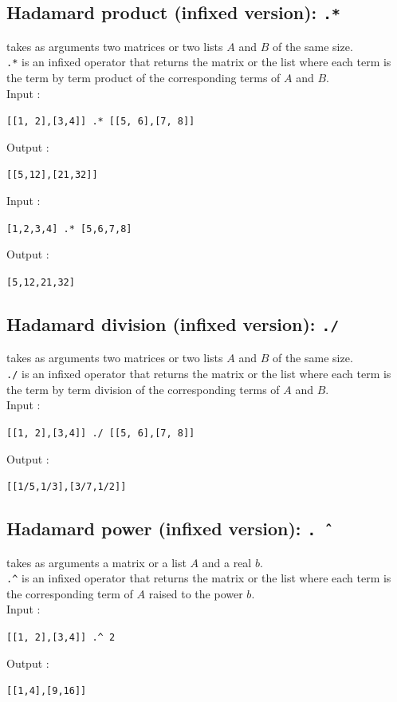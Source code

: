 \documentclass[a4paper,11pt]{book}
\begin{document}
\subsection{Hadamard product (infixed version): {\tt .*}}
 takes as arguments two matrices or two lists $A$ and  $B$ 
of the same size.\\
{\tt  .*} is an infixed operator that returns the matrix or the list 
where each term is the term by term product of the corresponding
terms of $A$ and  $B$.\\ 
Input :
\begin{center}{\tt [[1, 2],[3,4]] .* [[5, 6],[7, 8]]}\end{center}
Output :
\begin{center}{\tt [[5,12],[21,32]]}\end{center}
Input :
\begin{center}{\tt [1,2,3,4] .* [5,6,7,8]}\end{center}
Output :
\begin{center}{\tt [5,12,21,32]}\end{center}

\subsection{Hadamard division (infixed version): {\tt ./}}
 takes as arguments two matrices or two lists $A$ and 
$B$ of the same size.\\
{\tt  ./} is an infixed operator that returns the matrix or the list 
where each term is the term by term division of the corresponding
terms of $A$ and  $B$.\\ 
Input :
\begin{center}{\tt [[1, 2],[3,4]] ./ [[5, 6],[7, 8]]}\end{center}
Output :
\begin{center}{\tt [[1/5,1/3],[3/7,1/2]]}\end{center}

\subsection{Hadamard power (infixed version): {\tt .\^\ }}
 takes as arguments a matrix or a list
$A$ and a real $b$.\\
{\tt  .\verb|^|}  is an infixed operator that returns the matrix 
or the list where each term is the corresponding
term of $A$ raised to the power $b$.\\ 
Input :
\begin{center}{\tt [[1, 2],[3,4]] .\verb|^| 2}\end{center}
Output :
\begin{center}{\tt [[1,4],[9,16]]}\end{center}
\end{document}
